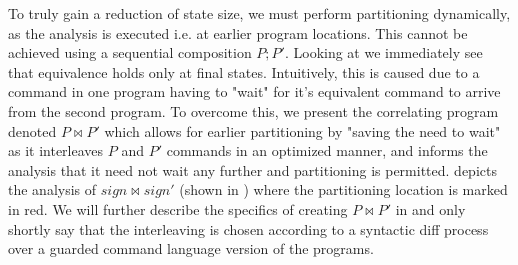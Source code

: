 To truly gain a reduction of state size, we must perform partitioning dynamically, as the analysis is executed i.e. at earlier program locations. This cannot be achieved using a sequential composition $P;P'$. Looking at  we immediately see that equivalence holds only at final states. Intuitively, this is caused due to a command in one program having to "wait" for it's equivalent command to arrive from the second program. To overcome this, we present the correlating program denoted $P \bowtie P'$ which allows for earlier partitioning by "saving the need to wait" as it interleaves $P$ and $P'$ commands in an optimized manner, and informs the analysis that it need not wait any further and partitioning is permitted.  depicts the analysis of $sign \bowtie sign'$ (shown in ) where the partitioning location is marked in red. We will further describe the specifics of creating $P \bowtie P'$ in  and only shortly say that the interleaving is chosen according to a syntactic diff process over a guarded command language version of the programs.






